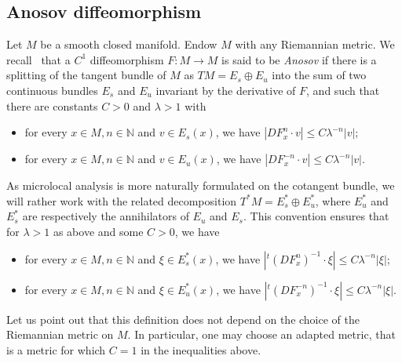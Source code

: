 \documentclass[10pt]{amsart}
\theoremstyle{definition}\newtheorem{defi}[theo]{Definition}\newtheorem{rema}[theo]{Remark}\newtheorem{exam}[theo]{Example}\newtheorem{exem}[theo]{Example}\newtheorem{nota}[theo]{Notation}
\newcommand{\bbN}{\mathbb{N}}
\begin{document}
\subsection{Anosov diffeomorphism}\label{subsection:Anosov_diffeomorphisms}

Let $M$ be a smooth closed manifold. Endow $M$ with any Riemannian metric. We recall~\cite[Definition~6.4.2]{katok_hasselblatt} that a $C^1$ diffeomorphism $F: M \to M$ is said to be \emph{Anosov} if there is a splitting of the tangent bundle of $M$ as $TM = E_s \oplus E_u$ into the sum of two continuous bundles $E_s$ and $E_u$ invariant by the derivative of $F$, and such that there are constants $C > 0$ and $\lambda > 1$ with
\begin{itemize}
\item for every $x \in M, n \in \bbN$ and $v \in E_s(x)$, we have $|DF^{n}_x \cdot v| \leq C \lambda^{-n} |v|$;
\item for every $x \in M, n \in \bbN$ and $v \in E_u(x)$, we have $|DF^{-n}_x \cdot v| \leq C \lambda^{-n} |v|$.
\end{itemize}

As microlocal analysis is more naturally formulated on the cotangent bundle, we will rather work with the related decomposition $T^* M = E_s^* \oplus E_u^*$, where $E_u^*$ and $E_s^*$ are respectively the annihilators of $E_u$ and $E_s$. This convention ensures that for $\lambda > 1$ as above and some $C > 0$, we have
\begin{itemize}
\item for every $x \in M, n \in \bbN$ and $\xi \in E_s^*(x)$, we have $|{}^t (DF^{n}_x)^{-1} \cdot \xi| \leq C \lambda^{-n} |\xi|$;
\item for every $x \in M, n \in \bbN$ and $\xi \in E_u^*(x)$, we have $|{}^t (DF^{-n}_x)^{-1} \cdot \xi| \leq C \lambda^{-n} |\xi|$.
\end{itemize}

Let us point out that this definition does not depend on the choice of the Riemannian metric on $M$. In particular, one may choose an adapted metric, that is a metric for which $C = 1$ in the inequalities above.
\end{document}
